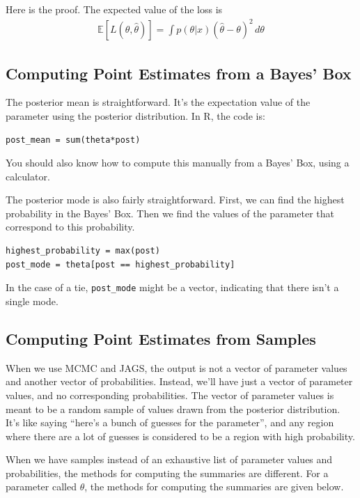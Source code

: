 Here is the proof. The expected value of the loss is
\begin{eqnarray}
\mathds{E}\left[L(\theta, \hat{\theta})\right] =
\int p(\theta|x)(\hat{\theta} - \theta)^2 \, d\theta
\end{eqnarray}




\subsection{Computing Point Estimates from a Bayes' Box}
The posterior mean is straightforward. It's the expectation value of the parameter
using the posterior distribution. In R, the code is:
\begin{framed}
\begin{verbatim}
post_mean = sum(theta*post)
\end{verbatim}
\end{framed}
You should also know how to compute this manually from a Bayes' Box, using a
calculator.

The posterior mode is also fairly straightforward. First, we can find the
highest probability in the Bayes' Box. Then we find the values of the parameter
that correspond to this probability.
\begin{framed}
\begin{verbatim}
highest_probability = max(post)
post_mode = theta[post == highest_probability]
\end{verbatim}
\end{framed}
In the case of a tie, {\tt post\_mode} might be a vector, indicating
that there isn't a single mode.



\subsection{Computing Point Estimates from Samples}
When we use MCMC and JAGS, the output is not a vector of parameter values and
another vector of probabilities. Instead, we'll have just a vector of parameter
values, and no corresponding probabilities. The vector of parameter values is
meant to be a random sample of values drawn from the posterior distribution.
It's like saying ``here's a bunch of guesses for the parameter'', and any
region where there are a lot of guesses is considered to be a region with high
probability.

When we have samples instead of an exhaustive list of parameter values and
probabilities, the methods for computing the summaries are different. For a
parameter called $\theta$, the methods for computing the summaries are given
below.


